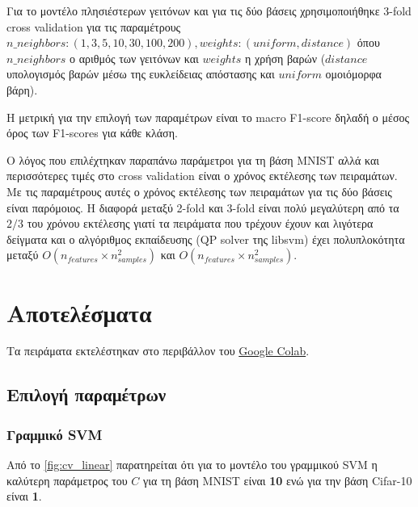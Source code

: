 \documentclass[a4paper]{article}
\begin{document}
Για το μοντέλο πλησιέστερων γειτόνων και για τις δύο βάσεις χρησιμοποιήθηκε
3-fold cross validation για τις παραμέτρους $n\_neighbors: (1, 3, 5, 10, 30,
100, 200), weights: (uniform, distance)$ όπου $n\_neighbors$ ο αριθμός των
γειτόνων και $weights$ η χρήση βαρών ($distance$ υπολογισμός βαρών μέσω της
ευκλείδειας απόστασης και $uniform$ ομοιόμορφα βάρη).

Η μετρική για την επιλογή των παραμέτρων είναι το macro F1-score δηλαδή ο μέσος
όρος των F1-scores για κάθε κλάση.

Ο λόγος που επιλέχτηκαν παραπάνω παράμετροι για τη βάση MNIST αλλά και
περισσότερες τιμές στο cross validation είναι ο χρόνος εκτέλεσης των πειραμάτων.
Με τις παραμέτρους αυτές ο χρόνος εκτέλεσης των πειραμάτων για τις δύο βάσεις
είναι παρόμοιος. Η διαφορά μεταξύ 2-fold και 3-fold είναι πολύ μεγαλύτερη από τα
$2/3$ του χρόνου εκτέλεσης γιατί τα πειράματα που τρέχουν έχουν και λιγότερα
δείγματα και ο αλγόριθμος εκπαίδευσης (QP solver της libsvm) έχει πολυπλοκότητα
μεταξύ $O(n_{features} \times n^2_{samples})$ και $O(n_{features} \times
n^2_{samples})$.


\section{Αποτελέσματα}

Τα πειράματα εκτελέστηκαν στο περιβάλλον του
\href{https://colab.research.google.com/}{Google Colab}.

\subsection{Επιλογή παραμέτρων}

\subsubsection{Γραμμικό SVM}

Από το \autoref{fig:cv_linear} παρατηρείται ότι για το μοντέλο του γραμμικού SVM
η καλύτερη παράμετρος του $C$ για τη βάση MNIST είναι {\bf10} ενώ για την βάση
Cifar-10 είναι {\bf1}.
\end{document}
